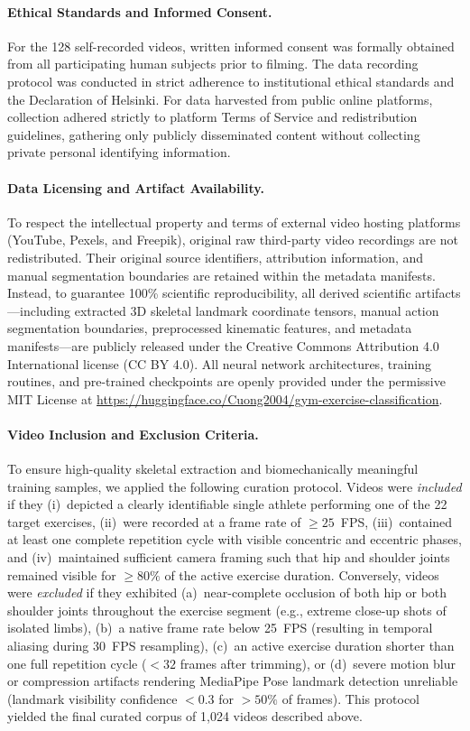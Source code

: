 \documentclass[runningheads]{llncs}
\begin{document}
\paragraph{Ethical Standards and Informed Consent.} For the 128 self-recorded videos, written informed consent was formally obtained from all participating human subjects prior to filming. The data recording protocol was conducted in strict adherence to institutional ethical standards and the Declaration of Helsinki. For data harvested from public online platforms, collection adhered strictly to platform Terms of Service and redistribution guidelines, gathering only publicly disseminated content without collecting private personal identifying information.

\paragraph{Data Licensing and Artifact Availability.} To respect the intellectual property and terms of external video hosting platforms (YouTube, Pexels, and Freepik), original raw third-party video recordings are not redistributed. Their original source identifiers, attribution information, and manual segmentation boundaries are retained within the metadata manifests. Instead, to guarantee 100\% scientific reproducibility, all derived scientific artifacts---including extracted 3D skeletal landmark coordinate tensors, manual action segmentation boundaries, preprocessed kinematic features, and metadata manifests---are publicly released under the Creative Commons Attribution 4.0 International license (CC BY 4.0). All neural network architectures, training routines, and pre-trained checkpoints are openly provided under the permissive MIT License at \url{https://huggingface.co/Cuong2004/gym-exercise-classification}.

\paragraph{Video Inclusion and Exclusion Criteria.} To ensure high-quality skeletal extraction and biomechanically meaningful training samples, we applied the following curation protocol. Videos were \textit{included} if they (i)~depicted a clearly identifiable single athlete performing one of the 22 target exercises, (ii)~were recorded at a frame rate of $\geq 25$~FPS, (iii)~contained at least one complete repetition cycle with visible concentric and eccentric phases, and (iv)~maintained sufficient camera framing such that hip and shoulder joints remained visible for $\geq 80\%$ of the active exercise duration. Conversely, videos were \textit{excluded} if they exhibited (a)~near-complete occlusion of both hip or both shoulder joints throughout the exercise segment (e.g., extreme close-up shots of isolated limbs), (b)~a native frame rate below 25~FPS (resulting in temporal aliasing during 30~FPS resampling), (c)~an active exercise duration shorter than one full repetition cycle ($< 32$ frames after trimming), or (d)~severe motion blur or compression artifacts rendering MediaPipe Pose landmark detection unreliable (landmark visibility confidence $< 0.3$ for $> 50\%$ of frames). This protocol yielded the final curated corpus of 1,024 videos described above.
\end{document}
